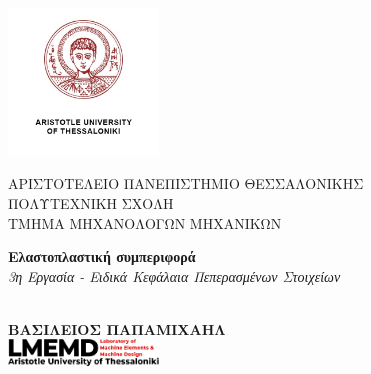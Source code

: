 \newcommand{\uni}{ΑΡΙΣΤΟΤΕΛΕΙΟ ΠΑΝΕΠΙΣΤΗΜΙΟ ΘΕΣΣΑΛΟΝΙΚΗΣ}
\newcommand{\faculty}{ΠΟΛΥΤΕΧΝΙΚΗ ΣΧΟΛΗ}
\newcommand{\tmhma}{ΤΜΗΜΑ ΜΗΧΑΝΟΛΟΓΩΝ ΜΗΧΑΝΙΚΩΝ}


\newcommand{\titlos}{Ελαστοπλαστική συμπεριφορά}
\newcommand{\ypotitlos}{3η Εργασία - Ειδικά Κεφάλαια Πεπερασμένων Στοιχείων}


\newcommand{\onomaauthor}{ΒΑΣΙΛΕΙΟΣ ΠΑΠΑΜΙΧΑΗΛ}


\newcommand{\advisor}{Γάκιας Χρήστος}
\newcommand{\mailauthor}{\href{mailto:vasilepi@meng.auth.gr}{vasilepi@meng.auth.gr}}
\newcommand{\aem}{6920}
\newcommand{\hmeromhnia}{\today}



\begin{titlepage}
    \begin{center}
    \includegraphics[width=4cm]{media/autheng.jpg}
     \end{center}
    
    \begin{center}
        \large
        \uni\\
        \normalsize
        \faculty\\
        \vspace{1em}
        \tmhma
    \end{center}

    \vspace{2cm}
    \begin{center}
        \Large
        \textbf{\titlos}\\
        \vspace{1em}
        \large
        \textit{\ypotitlos}
    \end{center}
    \begin{center}
        \\
    \vspace{7em}
    \Large
    \textcolor{BrickRed}{\textbf{\onomaauthor}}\\
    \vspace{3em}
    \includegraphics[width=0.3\textwidth]{media/newlogov3-cropped-content.png}
    \end{center}


\end{titlepage}
